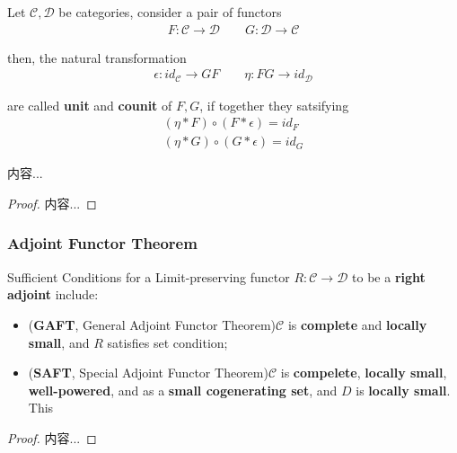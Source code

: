 \documentclass[Total.tex]{subfiles}
\begin{document}
			\begin{Def}
				Let $\mathcal{C},\mathcal{D}$ be categories, consider a pair of functors
				\begin{gather*}
					F:\mathcal{C}\rightarrow \mathcal{D}\qquad G:\mathcal{D}\rightarrow \mathcal{C}
				\end{gather*}
				
				then, the natural transformation
				\begin{gather*}
					\epsilon:id_\mathcal{C}\rightarrow GF\qquad \eta:FG\rightarrow id_\mathcal{D}
				\end{gather*}
				
				are called \textbf{unit} and \textbf{counit} of $F,G$, if together they satsifying
				\begin{gather*}
					(\eta*F)\circ (F*\epsilon)=id_F\\
					(\eta*G)\circ (G*\epsilon)=id_G
				\end{gather*}
				\begin{center}
				\end{center}
			\end{Def}
			
			\begin{proposition}
				内容...
			\end{proposition}
			\begin{proof}
				内容...
			\end{proof}
			
			\subsubsection{Adjoint Functor Theorem}
				
				\begin{theorem}
					Sufficient Conditions for a Limit-preserving functor $R:\mathcal{C}\rightarrow \mathcal{D}$ to be a \textbf{right adjoint} include:
					\begin{itemize}
						\item (\textbf{GAFT}, General Adjoint Functor Theorem)$\mathcal{C}$ is \textbf{complete} and \textbf{locally small}, and $R$ satisfies set condition;
						\item (\textbf{SAFT}, Special Adjoint Functor Theorem)$\mathcal{C}$  is \textbf{compelete}, \textbf{locally small}, \textbf{well-powered}, and as a \textbf{small cogenerating set}, and $D$ is \textbf{locally small}. This
					\end{itemize}
				\end{theorem}
				\begin{proof}
					内容...
				\end{proof}
				
\end{document}
